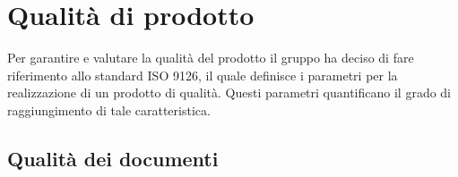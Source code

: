 \section{Qualità di prodotto}
	Per garantire e valutare la qualità del prodotto il gruppo ha deciso di fare riferimento allo standard ISO 9126, il quale definisce i parametri per la realizzazione di un prodotto di qualità. Questi parametri quantificano il grado di raggiungimento di tale caratteristica.
%		
%		
%		
%		
%		
	\subsection{Qualità dei documenti}
		
